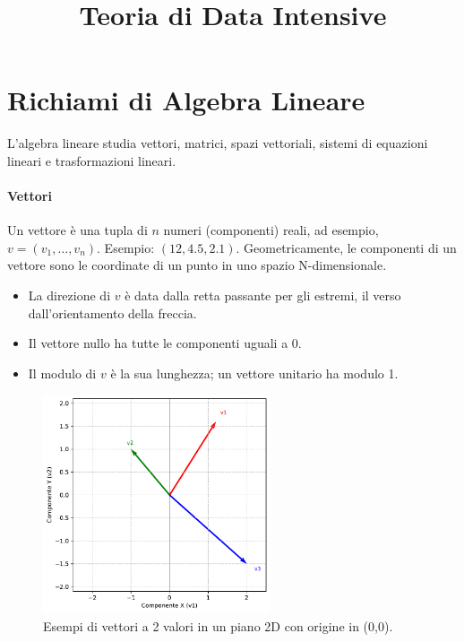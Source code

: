 \documentclass{article}
\title{Teoria di Data Intensive}
\author{}
\date{}
\begin{document}
\maketitle
\tableofcontents


\section{Richiami di Algebra Lineare}

L'algebra lineare studia vettori, matrici, spazi vettoriali, sistemi di equazioni lineari e trasformazioni lineari.


\paragraph{Vettori} Un vettore è una tupla di $n$ numeri (componenti) reali, ad esempio, $v = (v_1, \dots, v_n)$. Esempio: $(12, 4.5, 2.1)$.
Geometricamente, le componenti di un vettore sono le coordinate di un punto in uno spazio N-dimensionale.
\begin{itemize}
    \item La direzione di $v$ è data dalla retta passante per gli estremi, il verso dall'orientamento della freccia.
    \item Il vettore nullo ha tutte le componenti uguali a 0.
    \item Il modulo di $v$ è la sua lunghezza; un vettore unitario ha modulo 1.
\end{itemize}

\begin{figure}[H] 
    \centering
    \includegraphics[width=0.6\textwidth]{images/vector_example.pdf}
    \caption{Esempi di vettori a 2 valori in un piano 2D con origine in (0,0).}
    \label{fig:vector_example}
\end{figure}
\end{document}
